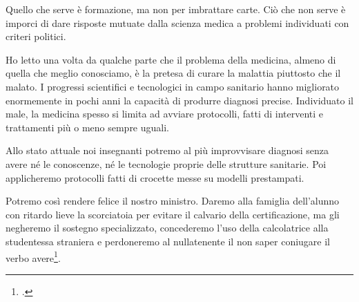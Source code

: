 Quello che serve è formazione, ma non per imbrattare carte. Ciò che non serve è imporci di dare risposte mutuate dalla scienza medica a problemi individuati con criteri politici.

Ho letto una volta da qualche parte che il problema della medicina, almeno di quella che meglio conosciamo, è la pretesa di curare la malattia piuttosto che il malato. I progressi scientifici e tecnologici in campo sanitario hanno migliorato enormemente in pochi anni la capacità di produrre diagnosi precise. Individuato il male, la medicina spesso si limita ad avviare protocolli, fatti di interventi e trattamenti più o meno sempre uguali.

Allo stato attuale noi insegnanti potremo al più improvvisare diagnosi senza avere né le conoscenze, né le tecnologie proprie delle strutture sanitarie. Poi applicheremo protocolli fatti di crocette messe su modelli prestampati.

Potremo così rendere felice il nostro ministro. Daremo alla famiglia dell'alunno con ritardo lieve la scorciatoia per evitare il calvario della certificazione, ma gli negheremo il sostegno specializzato, concederemo l'uso della calcolatrice alla studentessa straniera e perdoneremo al nullatenente il non saper coniugare il verbo avere\footcite{Carapella2013}.